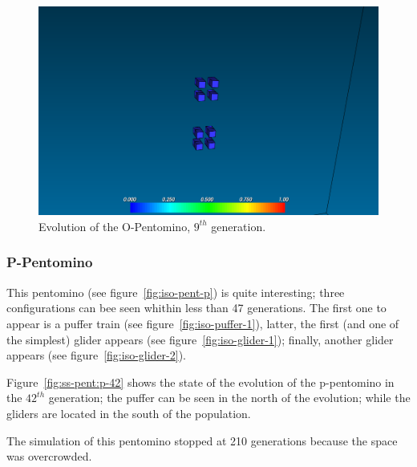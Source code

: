 \begin{figure}
	\centering
	\includegraphics[scale=0.3]{pentominoes_ss/o_osc.png}
	\caption{Evolution of the O-Pentomino, $9^{th}$ generation.}
  \label{fig:ss-pent:o-osc}
\end{figure}

\subsubsection{P-Pentomino}
\label{sec:p-pentomino}

This pentomino (see figure~\ref{fig:iso-pent-p}) is quite interesting; three
configurations can bee seen whithin less than 47 generations. The first one to
appear is a puffer train (see figure~\ref{fig:iso-puffer-1}), latter, the first
(and one of the simplest) glider appears (see figure~\ref{fig:iso-glider-1});
finally, another glider appears (see figure~\ref{fig:iso-glider-2}).

Figure~\ref{fig:ss-pent:p-42} shows the state of the evolution of the
p-pentomino in the $42^{th}$ generation; the puffer can be seen in the north
of the evolution; while the gliders are located in the south of the population.

The simulation of this pentomino stopped at 210 generations because the space
was overcrowded.


